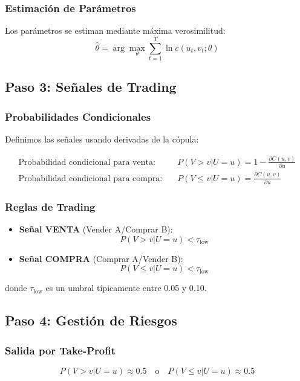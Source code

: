 \documentclass[12pt, a4paper]{myarticle}
\begin{document}
\subsubsection{Estimación de Parámetros}
Los parámetros se estiman mediante máxima verosimilitud:
\[
\hat{\theta} = \arg\max_{\theta} \sum_{t=1}^{T} \ln c(u_t, v_t; \theta)
\]

\subsection{Paso 3: Señales de Trading}

\subsubsection{Probabilidades Condicionales}
Definimos las señales usando derivadas de la cópula:

\begin{align*}
\text{Probabilidad condicional para venta:} & \quad P(V > v | U = u) = 1 - \frac{\partial C(u,v)}{\partial u} \\
\text{Probabilidad condicional para compra:} & \quad P(V \leq v | U = u) = \frac{\partial C(u,v)}{\partial u}
\end{align*}

\subsubsection{Reglas de Trading}

\begin{itemize}
    \item \textbf{Señal VENTA} (Vender A/Comprar B):
    \[
    P(V > v | U = u) < \tau_{\text{low}}
    \]
    \item \textbf{Señal COMPRA} (Comprar A/Vender B):
    \[
    P(V \leq v | U = u) < \tau_{\text{low}}
    \]
\end{itemize}
donde \( \tau_{\text{low}} \) es un umbral típicamente entre 0.05 y 0.10.

\subsection{Paso 4: Gestión de Riesgos}

\subsubsection{Salida por Take-Profit}
\[
P(V > v | U = u) \approx 0.5 \quad \text{o} \quad P(V \leq v | U = u) \approx 0.5
\]
\end{document}
